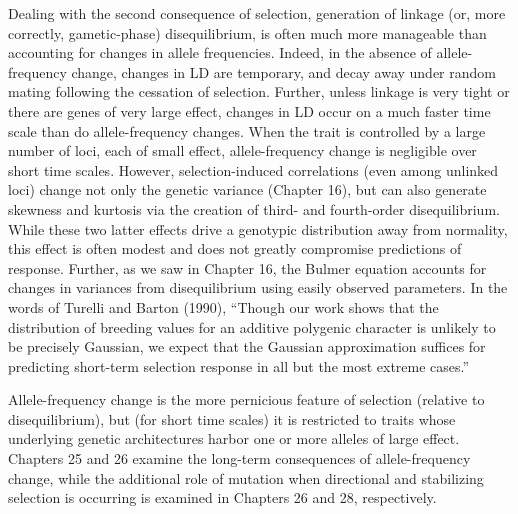 \documentclass{article}
\begin{document}
Dealing with the second consequence of selection, generation of linkage (or, more correctly, gametic-phase) disequilibrium, is often much more manageable than accounting for changes in allele frequencies. Indeed, in the absence of allele-frequency change, changes in LD are temporary, and decay away under random mating following the cessation of selection. Further, unless linkage is very tight or there are genes of very large effect, changes in LD occur on a much faster time scale than do allele-frequency changes. When the trait is controlled by a large number of loci, each of small effect, allele-frequency change is negligible over short time scales. However, selection-induced correlations (even among unlinked loci) change not only the genetic variance (Chapter 16), but can also generate skewness and kurtosis via the creation of third- and fourth-order disequilibrium. While these two latter effects drive a genotypic distribution away from normality, this effect is often modest and does not greatly compromise predictions of response. Further, as we saw in Chapter 16, the Bulmer equation accounts for changes in variances from disequilibrium using easily observed parameters. In the words of Turelli and Barton (1990), “Though our work shows that the distribution of breeding values for an additive polygenic character is unlikely to be precisely Gaussian, we expect that the Gaussian approximation suffices for predicting short-term selection response in all but the most extreme cases.”

Allele-frequency change is the more pernicious feature of selection (relative to disequilibrium), but (for short time scales) it is restricted to traits whose underlying genetic architectures harbor one or more alleles of large effect. Chapters 25 and 26 examine the long-term consequences of allele-frequency change, while the additional role of mutation when directional and stabilizing selection is occurring is examined in Chapters 26 and 28, respectively.
\end{document}
